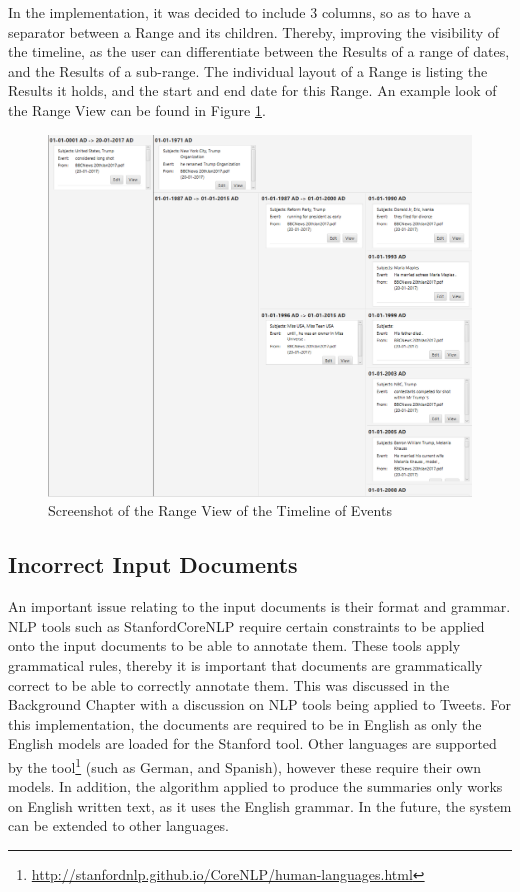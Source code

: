 \par  In the implementation, it was decided to include 3 columns, so as to have a separator between a Range and its children. Thereby, improving the visibility of the timeline, as the user can differentiate between the Results of a range of dates, and the Results of a sub-range. The individual layout of a Range is listing the Results it holds, and the start and end date for this Range. An example look of the Range View can be found in Figure \ref{fig:rangeView}.

\begin{figure}[H]
\caption{Screenshot of the Range View of the Timeline of Events}
\label{fig:rangeView}
\includegraphics[width=\linewidth]{rangeView.png}
\centering
\end{figure}
\subsection{Incorrect Input Documents}

\par An important issue relating to the input documents is their format and grammar. NLP tools such as StanfordCoreNLP require certain constraints to be applied onto the input documents to be able to annotate them. These tools apply grammatical rules, thereby it is important that documents are grammatically correct to be able to correctly annotate them. This was discussed in the Background Chapter with a discussion on NLP tools being applied to Tweets. For this implementation, the documents are required to be in English as only the English models are loaded for the Stanford tool. Other languages are supported by the tool\footnote{\url{http://stanfordnlp.github.io/CoreNLP/human-languages.html}} (such as German, and Spanish), however these require their own models. In addition, the algorithm applied to produce the summaries only works on English written text, as it uses the English grammar. In the future, the system can be extended to other languages.

